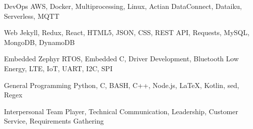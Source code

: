 

\begin{cvskills}

  \cvskill
    {DevOps} %
    {AWS, Docker, Multiprocessing, Linux, Actian DataConnect, Dataiku, Serverless, MQTT} %

  \cvskill
    {Web} %
    {Jekyll, Redux, React, HTML5, JSON, CSS, REST API, Requests, MySQL, MongoDB, DynamoDB} %

  \cvskill
    {Embedded} %
    {Zephyr RTOS, Embedded C, Driver Development, Bluetooth Low Energy, LTE, IoT, UART, I2C, SPI}%

  \cvskill
    {General Programming} %
    {Python, C, BASH, C++, Node.js, LaTeX, Kotlin, sed, Regex} %

  \cvskill
    {Interpersonal} %
    {Team Player, Technical Communication, Leadership, Customer Service, Requirements Gathering} %


\end{cvskills}
